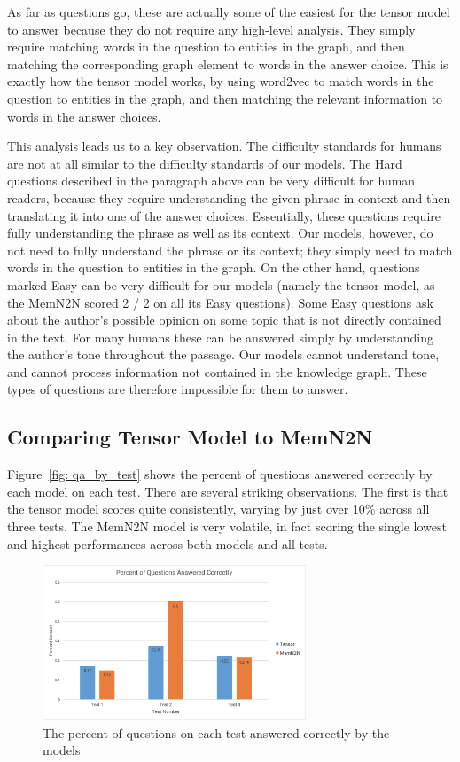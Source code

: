 \documentclass[pageno]{final_paper}
\begin{document}
As far as questions go, these are actually some of the easiest for the tensor
model to answer because they do not require any high-level analysis. They simply
require matching words in the question to entities in the graph, and then
matching the corresponding graph element to words in the answer choice. This
is exactly how the tensor model works, by using word2vec to match words in the
question to entities in the graph, and then matching the relevant information to
words in the answer choices.

This analysis leads us to a key observation. The difficulty standards for humans
are not at all similar to the difficulty standards of our models. The Hard
questions described in the paragraph above can be very difficult for human
readers, because they require understanding the given phrase in context and then
translating it into one of the answer choices. Essentially, these questions
require fully understanding the phrase as well as its context. Our models,
however, do not need to fully understand the phrase or its context; they simply
need to match words in the question to entities in the graph. On the other hand,
questions marked Easy can be very difficult for our models (namely the tensor model,
as the MemN2N scored 2 / 2 on all its Easy questions). Some Easy questions ask
about the author's possible opinion on some topic that is not directly contained
in the text. For many humans these can be answered simply by understanding the
author's tone throughout the passage. Our models cannot understand tone, and
cannot process information not contained in the knowledge graph. These types
of questions are therefore impossible for them to answer.

\subsection{Comparing Tensor Model to MemN2N}
\label{Comparing Tensor Model to MemN2N}

Figure~\ref{fig: qa_by_test} shows the percent of questions answered correctly
by each model on each test. There are several striking observations. The first
is that the tensor model scores quite consistently, varying by just over 10\%
across all three tests. The MemN2N model is very volatile, in fact scoring the
single lowest and highest performances across both models and all tests.

\begin{figure}[!tb]
    \centering
    \includegraphics[width=0.7\textwidth,keepaspectratio]{figures/qa_by_test.png}
    \caption{The percent of questions on each test answered correctly by the models}
    \label{fig: qa_by_percent}
\end{figure}
\end{document}
